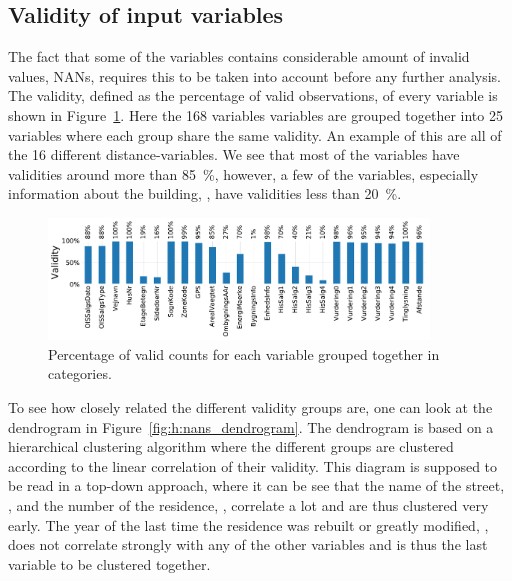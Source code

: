 \subsection{Validity of input variables}

The fact that some of the variables contains considerable amount of invalid values, NANs, requires this to be taken into account before any further analysis. The validity, defined as the percentage of valid observations, of every variable is shown in Figure~\ref{fig:h:nans}. Here the \num{168} variables variables are grouped together into \num{25} variables where each group share the same validity. An example of this are all of the \num{16} different distance-variables. We see that most of the variables have validities around more than 
\SI{85}{\percent}, however, a few of the variables, especially information about the building, , have validities less than \SI{20}{\percent}. 


\begin{figure}
  \centerfloat
  \includegraphics[width=0.9\textwidth, trim=0 0 0 0, clip]{figures/housing/missing_bar.pdf}
  \caption[Validity of input features]
          {Percentage of valid counts for each variable grouped together in categories.}
  \label{fig:h:nans}
\end{figure}

To see how closely related the different validity groups are, one can look at the dendrogram in Figure~\ref{fig:h:nans_dendrogram}. The dendrogram is based on a hierarchical clustering algorithm \citep{virtanenSciPyFundamentalAlgorithms2019} where the different groups are clustered according to the linear correlation of their validity. This diagram is supposed to be read in a top-down approach, where it can be see that the name of the street, , and the number of the residence, , correlate a lot and are thus clustered very early. The year of the last time the residence was rebuilt or greatly modified, , does not correlate strongly with any of the other variables and is thus the last variable to be clustered together. 

